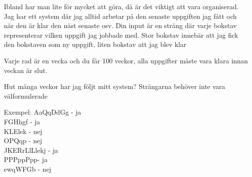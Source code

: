 Ibland har man lite för mycket att göra, då är det viktigt att vara organiserad. Jag har ett system där jag alltid arbetar på den senaste uppgiften jag fått och när den är klar den näst senaste osv. Din input är en sträng där varje bokstav representerar vilken uppgift jag jobbade med. Stor bokstav innebär att jag fick den bokstaven som ny uppgift, liten bokstav att jag blev klar

Varje rad är en vecka och du får 100 veckor, alla uppgifter måste vara klara innan veckan är slut.

Hut många veckor har jag följt mitt system? Strängarna behöver inte vara välformulerade

Exempel:
AaQqDdGg - ja \\
FGHhgf - ja \\
KLElek - nej \\
OPQqp - nej \\
JKERrLlLlekj - ja \\
PPPppPpp- ja \\
ewqWFGb - nej \\
